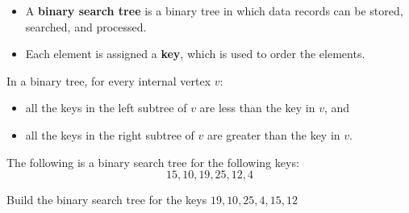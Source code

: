 \documentclass[../mathNotesPreamble]{subfiles}
\begin{document}
  \begin{defn*}
    \begin{itemize}
      \item A \textbf{binary search tree} is a binary tree in which data records can be stored, searched, and processed.
      \item Each element is assigned a \textbf{key}, which is used to order the elements.
    \end{itemize}
    In a binary tree, for every internal vertex $v$:
    \begin{itemize}
      \item all the keys in the left subtree of $v$ are less than the key in $v$, and
      \item all the keys in the right subtree of $v$ are greater than the key in $v$.
    \end{itemize}
  \end{defn*}
  \begin{ex*}
    The following is a binary search tree for the following keys:
      \[15, 10, 19, 25, 12, 4\]
    \begin{center}
    \end{center}
  \end{ex*}

  \begin{ex*}
    Build the binary search tree for the keys $19, 10, 25, 4, 15, 12$
  \end{ex*}
  \pagebreak
\end{document}
